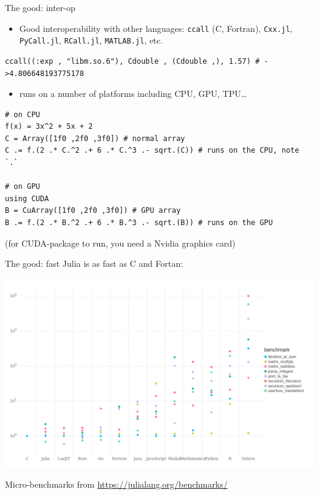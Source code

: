 \documentclass[compress,presentation,aspectratio=169]{beamer}
\begin{document}
\begin{frame}[fragile,label={sec:orgbd9378c}]{The good: inter-op}
  \footnotesize
 \begin{itemize}
\item Good interoperability with other languages: \texttt{ccall} (C, Fortran),
\texttt{Cxx.jl}, \texttt{PyCall.jl}, \texttt{RCall.jl}, \texttt{MATLAB.jl}, etc.
\end{itemize}

\begin{verbatim}
ccall((:exp , "libm.so.6"), Cdouble , (Cdouble ,), 1.57) # ->4.806648193775178
\end{verbatim}
\pause

\begin{itemize}
\item runs on a number of platforms including CPU, GPU, TPU\ldots{}
\end{itemize}

\begin{verbatim}
# on CPU
f(x) = 3x^2 + 5x + 2
C = Array([1f0 ,2f0 ,3f0]) # normal array
C .= f.(2 .* C.^2 .+ 6 .* C.^3 .- sqrt.(C)) # runs on the CPU, note `.`

# on GPU
using CUDA
B = CuArray([1f0 ,2f0 ,3f0]) # GPU array
B .= f.(2 .* B.^2 .+ 6 .* B.^3 .- sqrt.(B)) # runs on the GPU
\end{verbatim}
(for CUDA-package to run, you need a Nvidia graphics card)
\end{frame}

\begin{frame}[label={sec:orgd62e75c}]{The good: fast}
  \footnotesize
Julia is as fast as C and Fortan:

\begin{center}
\includegraphics[width=.8\linewidth]{./figs/bench.png}
\end{center}
Micro-benchmarks from \url{https://julialang.org/benchmarks/}
\end{frame}
\end{document}
